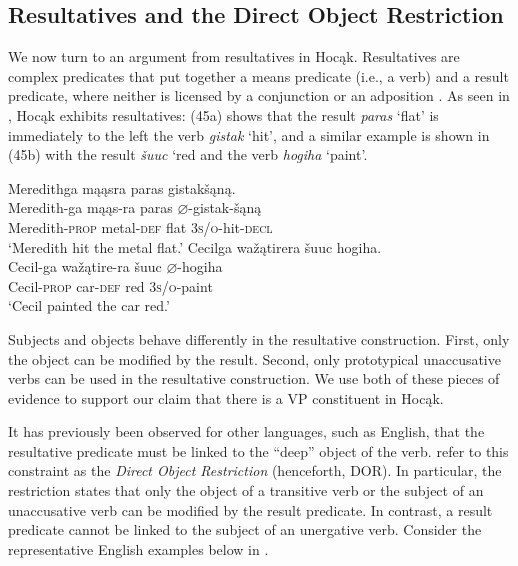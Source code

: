 \documentclass[output=paper]{LSP/langsci}
\begin{document}
\subsection{Resultatives and the Direct Object Restriction}

We now turn to an argument from resultatives in Hocąk. Resultatives are complex predicates that put together a means predicate (i.e., a verb) and a result predicate, where neither is licensed by a conjunction or an adposition \citep[507]{Williams2008}. As seen in , Hocąk exhibits resultatives: (45a) shows that the result \textit{paras} `flat' is immediately to the left the verb \textit{gistak} `hit', and a similar example is shown in (45b) with the result \textit{\v{s}uuc} `red and the verb \textit{hogiha} `paint'.

\begin{exe}
\ex
\begin{xlist}
\ex 
\glll Meredithga	mąąsra		paras	gistak\v{s}ąną.\\
Meredith-ga			mąąs-ra	paras	$\varnothing$-gistak-\v{s}ąną \\
	Meredith-\textsc{prop}		metal-\textsc{def}		flat	 \textsc{3s/o}-hit-\textsc{decl} \\
\trans `Meredith hit the metal flat.'
\ex 
\glll Cecilga	wa\v{z}ątirera	 \v{s}uuc	hogiha.\\
Cecil-ga	wa\v{z}ątire-ra \v{s}uuc	$\varnothing$-hogiha \\
	Cecil-\textsc{prop}	car-\textsc{def}	red		\textsc{3s/o}-paint \\
\trans `Cecil painted the car red.'
\end{xlist}
\end{exe}

Subjects and objects behave differently in the resultative construction. First, only the object can be modified by the result. Second, only prototypical unaccusative verbs can be used in the resultative construction. We use both of these pieces of evidence to support our claim that there is a VP constituent in Hocąk.

It has previously been observed for other languages, such as English, that the resultative predicate must be linked to the ``deep'' object of the verb.  \citet{LevinRappaportHovav1995} refer to this constraint as the \textit{Direct Object Restriction} (henceforth, DOR). In particular, the restriction states that only the object of a transitive verb or the subject of an unaccusative verb can be modified by the result predicate. In contrast, a result predicate cannot be linked to the subject of an unergative verb. Consider the representative English examples below in .
\end{document}
